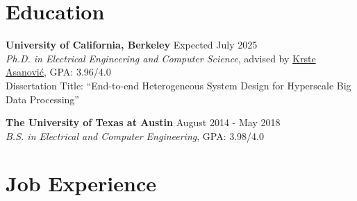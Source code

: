 \documentclass[line]{res}
\begin{document}
\address{\href{https://abejgonzalez.github.io}{https://abejgonzalez.github.io} $|$ \href{mailto:abe.gonzalez@berkeley.edu}{abe.gonzalez@berkeley.edu}}

\begin{resume}

\vspace{-6mm}

\section{\Large{Education}}
\label{sec:education}
\vspace{2mm}

\textbf{University of California, Berkeley} \hfill Expected July 2025
\\
\textit{Ph.D. in Electrical Engineering and Computer Science}, advised by \href{https://people.eecs.berkeley.edu/~krste/}{Krste Asanovi\'c}, GPA: 3.96/4.0
\\
Dissertation Title: ``End-to-end Heterogeneous System Design for Hyperscale Big Data Processing''

\textbf{The University of Texas at Austin} \hfill August 2014 - May 2018
\\
\textit{B.S. in Electrical and Computer Engineering}, GPA: 3.98/4.0

\section{\Large{Job Experience}}
\label{sec:jobs}
\vspace{2mm}


\end{resume}
\end{document}
